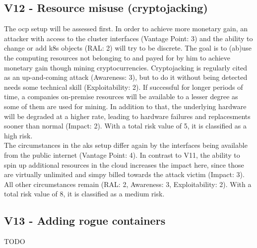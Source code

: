 \subsection{V12 - Resource misuse (cryptojacking)}

The \gls{ocp} setup will be assessed first.
In order to achieve more monetary gain, an attacker with access to the cluster interfaces (Vantage Point: 3) and the ability to change or add \gls{k8s} objects (RAL: 2) will try to be discrete. 
The goal is to (ab)use the computing resources not belonging to and payed for by him to achieve monetary gain though mining cryptocurrencies.
Cryptojacking is regularly cited as an up-and-coming attack (Awareness: 3), but to do it without being detected needs some technical skill (Exploitability: 2).
If successful for longer periods of time, a companies on-premise resources will be available to a lesser degree as some of them are used for mining. In addition to that, the underlying hardware will be degraded at a higher rate, leading to hardware failures and replacesments sooner than normal (Impact: 2).
With a total risk value of 5, it is classified as a high risk. \\


The circumstances in the \gls{aks} setup differ again by the interfaces being available from the public internet (Vantage Point: 4).
In contrast to V11, the ability to spin up additional resources in the cloud increases the impact here, since those are virtually unlimited and simpy billed towards the attack victim (Impact: 3).
All other circumstances remain (RAL: 2, Awareness: 3, Exploitability: 2).
With a total risk value of 8, it is classified as a medium risk.

\subsection{V13 - Adding rogue containers}

TODO

